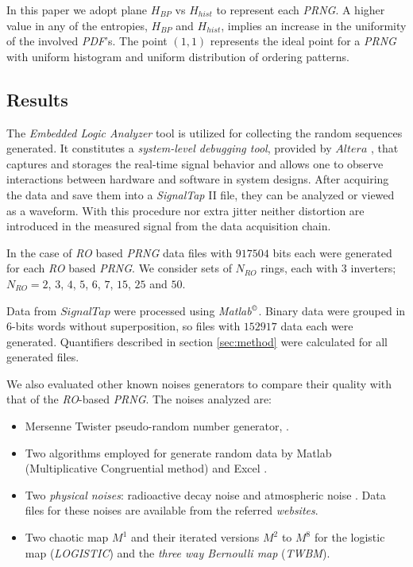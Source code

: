 In this paper we adopt plane $H_{BP}$ vs $H_{hist}$ \cite{DeMicco2008}  to represent each \emph{PRNG}. A higher
value in any of the entropies, $H_{BP}$ and $H_{hist}$, implies an
increase in the uniformity of the involved \emph{PDF}'s. The point
$(1,1)$ represents the ideal point for a \emph{PRNG} with uniform histogram and
uniform distribution of ordering patterns.

\subsection{Results}
\label{sec:results}
%

The  \emph{Embedded Logic Analyzer} tool is utilized for collecting the random sequences generated.
It constitutes a \emph{system-level debugging tool}, provided by $Altera$  \cite{QUARTUS}, that captures and storages the real-time signal behavior and allows one to observe interactions between hardware and software in system designs. After acquiring
the data and  save them into a \emph{SignalTap} II file, they can be
analyzed or viewed as a waveform. With this procedure nor extra jitter neither distortion are introduced in the measured signal from the data acquisition chain.


In the case of \emph{RO} based \emph{PRNG}
data files with $917504$ bits each were generated for each \emph{RO} based \emph{PRNG}.
We consider sets of $N_{RO}$ rings, each with $3$ inverters; $N_{RO}=2$, $3$, $4$, $5$, $6$, $7$, $15$, $25$ and $50$.

Data from $SignalTap$ were  processed using \emph{Matlab}$^\copyright$. Binary data were grouped in $6$-bits words without
superposition, so files with $152917$ data each were generated. Quantifiers described in section \ref{sec:method} were calculated
for all generated files.

We also evaluated other known noises generators to compare their quality with that of  the \emph{RO}-based \emph{PRNG}.
The noises analyzed are:


\begin{itemize}
  \item Mersenne Twister pseudo-random number generator, \cite{Matsumoto1998}.
  \item Two algorithms employed for generate random data by Matlab (Multiplicative Congruential method) \cite{Matlab} and Excel \cite{McLeod1985}.
  \item Two \emph{physical noises}: radioactive decay noise \cite{Walker2001} and atmospheric noise \cite{Haahr}.
  Data files for these noises are available from the referred \emph{websites}.
  \item Two chaotic map $M^1$ and their iterated versions $M^2$ to $M^8$ \cite{DeMicco2008} for the logistic map (\emph{LOGISTIC}) and the \emph{three way Bernoulli map} (\emph{TWBM}).
\end{itemize}

